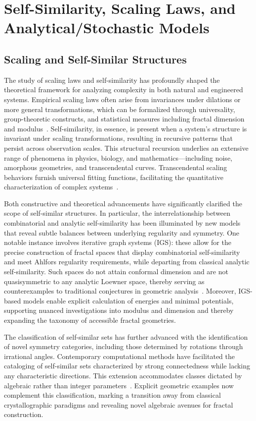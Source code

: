 \section{Self-Similarity, Scaling Laws, and Analytical/Stochastic Models}

\subsection{Scaling and Self-Similar Structures}

The study of scaling laws and self-similarity has profoundly shaped the theoretical framework for analyzing complexity in both natural and engineered systems. Empirical scaling laws often arise from invariances under dilations or more general transformations, which can be formalized through universality, group-theoretic constructs, and statistical measures including fractal dimension and modulus~\cite{ref56,ref63}. Self-similarity, in essence, is present when a system's structure is invariant under scaling transformations, resulting in recursive patterns that persist across observation scales. This structural recursion underlies an extensive range of phenomena in physics, biology, and mathematics—including noise, amorphous geometries, and transcendental curves. Transcendental scaling behaviors furnish universal fitting functions, facilitating the quantitative characterization of complex systems~\cite{ref56}.

Both constructive and theoretical advancements have significantly clarified the scope of self-similar structures. In particular, the interrelationship between combinatorial and analytic self-similarity has been illuminated by new models that reveal subtle balances between underlying regularity and symmetry. One notable instance involves iterative graph systems (IGS): these allow for the precise construction of fractal spaces that display combinatorial self-similarity and meet Ahlfors regularity requirements, while departing from classical analytic self-similarity. Such spaces do not attain conformal dimension and are not quasisymmetric to any analytic Loewner space, thereby serving as counterexamples to traditional conjectures in geometric analysis~\cite{ref11}. Moreover, IGS-based models enable explicit calculation of energies and minimal potentials, supporting nuanced investigations into modulus and dimension and thereby expanding the taxonomy of accessible fractal geometries.

The classification of self-similar sets has further advanced with the identification of novel symmetry categories, including those determined by rotations through irrational angles. Contemporary computational methods have facilitated the cataloging of self-similar sets characterized by strong connectedness while lacking any characteristic directions. This extension accommodates classes dictated by algebraic rather than integer parameters~\cite{ref31}. Explicit geometric examples now complement this classification, marking a transition away from classical crystallographic paradigms and revealing novel algebraic avenues for fractal construction.

